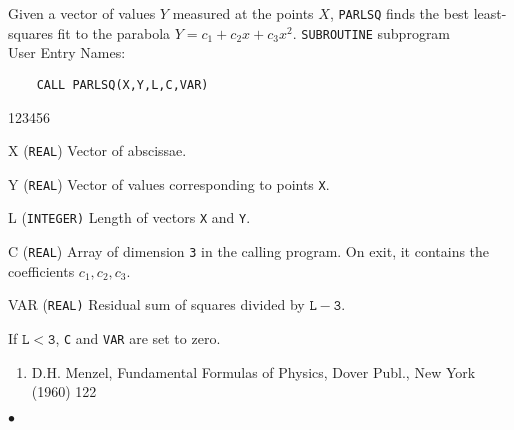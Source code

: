                           
                           
                      
\begin{center}
\end{center}
Given a vector of values $Y$ measured at the points $X$, {\tt PARLSQ}
finds the best least-squares fit to the parabola $Y=c_1+c_2 x+c_3 x^2$.
\Structure
{\tt SUBROUTINE} subprogram \\
User Entry Names: 
\Usage
\begin{verbatim}
    CALL PARLSQ(X,Y,L,C,VAR)
\end{verbatim}
\begin{DLtt}{123456}
\item[X] ({\tt REAL}) Vector of abscissae.
\item[Y] ({\tt REAL}) Vector of values corresponding to points {\tt X}.
\item[L] ({\tt INTEGER)} Length of vectors {\tt X} and {\tt Y}.
\item[C] ({\tt REAL}) Array of dimension {\tt 3} in the calling program.
On exit, it contains the coefficients $c_1,c_2,c_3$.
\item[VAR] ({\tt REAL)} Residual sum of squares divided by
$\mathtt{L-3}$.
\end{DLtt}
\Notes
If $\mathtt{L < 3}$, {\tt C} and {\tt VAR} are set to zero.
\Refer
\begin{enumerate}
\item D.H. Menzel, Fundamental Formulas of Physics, Dover Publ., New York
(1960) 122
\end{enumerate}
$\bullet$
